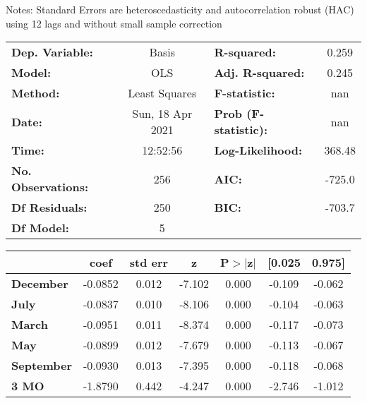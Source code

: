 Notes: \newline
 [1] Standard Errors are heteroscedasticity and autocorrelation robust (HAC) using 12 lags and without small sample correction
\begin{center}
\begin{tabular}{lclc}
\toprule
\textbf{Dep. Variable:}    &      Basis       & \textbf{  R-squared:         } &     0.259   \\
\textbf{Model:}            &       OLS        & \textbf{  Adj. R-squared:    } &     0.245   \\
\textbf{Method:}           &  Least Squares   & \textbf{  F-statistic:       } &       nan   \\
\textbf{Date:}             & Sun, 18 Apr 2021 & \textbf{  Prob (F-statistic):} &      nan    \\
\textbf{Time:}             &     12:52:56     & \textbf{  Log-Likelihood:    } &    368.48   \\
\textbf{No. Observations:} &         256      & \textbf{  AIC:               } &    -725.0   \\
\textbf{Df Residuals:}     &         250      & \textbf{  BIC:               } &    -703.7   \\
\textbf{Df Model:}         &           5      & \textbf{                     } &             \\
\bottomrule
\end{tabular}
\begin{tabular}{lcccccc}
                   & \textbf{coef} & \textbf{std err} & \textbf{z} & \textbf{P$> |$z$|$} & \textbf{[0.025} & \textbf{0.975]}  \\
\midrule
\textbf{December}  &      -0.0852  &        0.012     &    -7.102  &         0.000        &       -0.109    &       -0.062     \\
\textbf{July}      &      -0.0837  &        0.010     &    -8.106  &         0.000        &       -0.104    &       -0.063     \\
\textbf{March}     &      -0.0951  &        0.011     &    -8.374  &         0.000        &       -0.117    &       -0.073     \\
\textbf{May}       &      -0.0899  &        0.012     &    -7.679  &         0.000        &       -0.113    &       -0.067     \\
\textbf{September} &      -0.0930  &        0.013     &    -7.395  &         0.000        &       -0.118    &       -0.068     \\
\textbf{3 MO}      &      -1.8790  &        0.442     &    -4.247  &         0.000        &       -2.746    &       -1.012     \\

\end{tabular}
\end{center}
